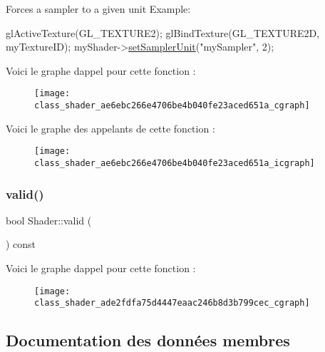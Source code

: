 Forces a sampler to a given unit Example\+: 
\begin{DoxyCode}
glActiveTexture(GL\_TEXTURE2);
glBindTexture(GL\_TEXTURE2D, myTextureID);
myShader->\hyperlink{class_shader_ae6ebc266e4706be4b040fe23aced651a}{setSamplerUnit}(\textcolor{stringliteral}{"mySampler"}, 2);
\end{DoxyCode}
 Voici le graphe d\textquotesingle{}appel pour cette fonction \+:\nopagebreak
\begin{figure}[H]
\begin{center}
\leavevmode
\texttt{[image: class\_shader\_ae6ebc266e4706be4b040fe23aced651a\_cgraph]}
\end{center}
\end{figure}
Voici le graphe des appelants de cette fonction \+:\nopagebreak
\begin{figure}[H]
\begin{center}
\leavevmode
\texttt{[image: class\_shader\_ae6ebc266e4706be4b040fe23aced651a\_icgraph]}
\end{center}
\end{figure}
\mbox{\label{class_shader_ade2fdfa75d4447eaac246b8d3b799cec}} 
\subsubsection{\texorpdfstring{valid()}{valid()}}
{\footnotesize\ttfamily bool Shader\+::valid (\begin{DoxyParamCaption}{ }\end{DoxyParamCaption}) const\hspace{0.3cm}{\ttfamily [inline]}}

Voici le graphe d\textquotesingle{}appel pour cette fonction \+:\nopagebreak
\begin{figure}[H]
\begin{center}
\leavevmode
\texttt{[image: class\_shader\_ade2fdfa75d4447eaac246b8d3b799cec\_cgraph]}
\end{center}
\end{figure}


\subsection{Documentation des données membres}
\mbox{\label{class_shader_a2cf5f11fb1cfd53e9106285b6b9da0b4}} 
